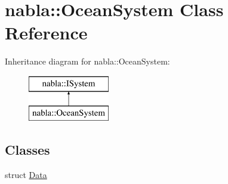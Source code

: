 \hypertarget{classnabla_1_1_ocean_system}{}\section{nabla\+::Ocean\+System Class Reference}
\label{classnabla_1_1_ocean_system}
Inheritance diagram for nabla\+::Ocean\+System\+:\begin{figure}[H]
\begin{center}
\leavevmode
\includegraphics[height=2.000000cm]{classnabla_1_1_ocean_system}
\end{center}
\end{figure}
\subsection*{Classes}
\begin{DoxyCompactItemize}
\item 
struct \mbox{\hyperlink{structnabla_1_1_ocean_system_1_1_data}{Data}}
\end{DoxyCompactItemize}
